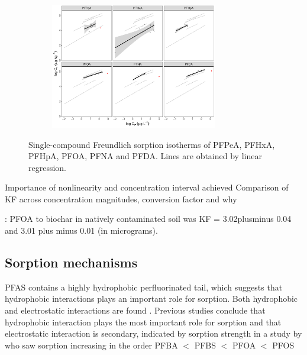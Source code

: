 \begin{figure}[t]\ContinuedFloat
        \begin{subfigure}[]{\linewidth}
            \centering
            \includegraphics[width=0.8\textwidth]{R/figs/CWC_facet_isotherm.pdf}
            \label{fig:CWC_isotherm}
        \end{subfigure}
        \caption{Single-compound Freundlich sorption isotherms of PFPeA, PFHxA, PFHpA, PFOA, PFNA and PFDA. Lines are obtained by linear regression.}
        \label{fig:sorption_isotherms_all}
\end{figure}



Importance of nonlinearity and concentration interval achieved 
Comparison of KF across concentration magnitudes, conversion factor and why

\citep{Kupryianchyk2016b}: PFOA to biochar in natively contaminated soil was KF = 3.02plusminus 0.04 and 3.01 plus minus 0.01 (in micrograms). 

\subsection{Sorption mechanisms}
PFAS contains a highly hydrophobic perfluorinated tail, which suggests that hydrophobic interactions plays an important role for sorption. 
Both hydrophobic and electrostatic interactions are found \citep{zhang2013sorption}. Previous studies conclude that hydrophobic interaction plays the most important role for sorption and that electrostatic interaction is secondary, indicated by sorption strength in a study by \cite{zhang2021sorption} who saw sorption increasing in the order PFBA $<$ PFBS $<$ PFOA $<$ PFOS 

